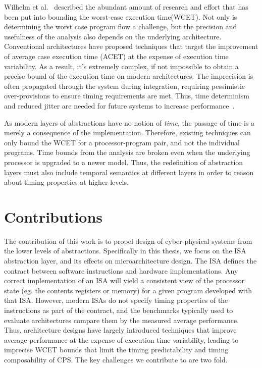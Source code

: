Wilhelm et al.~\cite{Wilhelm2008survey} described the abundant amount of research and effort that has been put into bounding the worst-case execution time(WCET).   
Not only is determining the worst case program flow a challenge, but the precision and usefulness of the analysis also depends on the underlying architecture\cite{Heckmann2003processor}. 
Conventional architectures have proposed techniques that target the improvement of average case execution time (ACET) at the expense of execution time variability.    
As a result, it's extremely complex, if not impossible to obtain a precise bound of the execution time on modern architectures.
The imprecision is often propagated through the system during integration, requiring pessimistic over-provisions to ensure timing requirements are met.     
Thus, time determinism and reduced jitter are needed for future systems to increase performance~\cite{Sangiovanni-Vincentelli2007automotive}.    

As modern layers of abstractions have no notion of \emph{time}, the passage of time is a merely a consequence of the implementation.  
Therefore, existing techniques can only bound the WCET for a processor-program pair, and not the individual programs.
Time bounds from the analysis are broken even when the underlying processor is upgraded to a newer model.
Thus, the redefinition of abstraction layers must also include temporal semantics at different layers in order to reason about timing properties at higher levels.  

\section{Contributions}
The contribution of this work is to propel design of cyber-physical systems from the lower levels of abstractions. 
Specifically in this thesis, we focus on the ISA abstraction layer, and its effects on microarchitecture design. 
The ISA defines the contract between software instructions and hardware implementations.
Any correct implementation of an ISA will yield a consistent view of the processor state (eg. the contents registers or memory) for a given program developed with that ISA.     
However, modern ISAs do not specify timing properties of the instructions as part of the contract, and the benchmarks typically used to evaluate architectures compare them by the measured average performance.   
Thus, architecture designs have largely introduced techniques that improve average performance at the expense of execution time variability, leading to imprecise WCET bounds that limit the timing predictability and timing composability of CPS.
The key challenges we contribute to are two fold.

